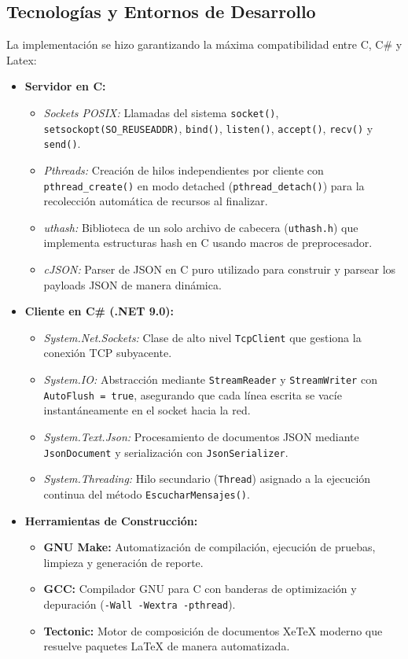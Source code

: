 \documentclass[12pt,a4paper]{article}
\begin{document}
\subsection{Tecnologías y Entornos de Desarrollo}
La implementación se hizo garantizando la máxima compatibilidad entre C, C\# y Latex:
\begin{itemize}
    \item \textbf{Servidor en C:}
    \begin{itemize}
        \item \textit{Sockets POSIX:} Llamadas del sistema \texttt{socket()}, \texttt{setsockopt(SO\_REUSEADDR)}, \texttt{bind()}, \texttt{listen()}, \texttt{accept()}, \texttt{recv()} y \texttt{send()}.
        \item \textit{Pthreads:} Creación de hilos independientes por cliente con \texttt{pthread\_create()} en modo detached (\texttt{pthread\_detach()}) para la recolección automática de recursos al finalizar.
        \item \textit{uthash:} Biblioteca de un solo archivo de cabecera (\texttt{uthash.h}) que implementa estructuras hash en C usando macros de preprocesador.
        \item \textit{cJSON:} Parser de JSON en C puro utilizado para construir y parsear los payloads JSON de manera dinámica.
    \end{itemize}
    \item \textbf{Cliente en C\# (.NET 9.0):}
    \begin{itemize}
        \item \textit{System.Net.Sockets:} Clase de alto nivel \texttt{TcpClient} que gestiona la conexión TCP subyacente.
        \item \textit{System.IO:} Abstracción mediante \texttt{StreamReader} y \texttt{StreamWriter} con \texttt{AutoFlush = true}, asegurando que cada línea escrita se vacíe instantáneamente en el socket hacia la red.
        \item \textit{System.Text.Json:} Procesamiento de documentos JSON mediante \texttt{JsonDocument} y serialización con \texttt{JsonSerializer}.
        \item \textit{System.Threading:} Hilo secundario (\texttt{Thread}) asignado a la ejecución continua del método \texttt{EscucharMensajes()}.
    \end{itemize}
    \item \textbf{Herramientas de Construcción:}
    \begin{itemize}
        \item \textbf{GNU Make:} Automatización de compilación, ejecución de pruebas, limpieza y generación de reporte.
        \item \textbf{GCC:} Compilador GNU para C con banderas de optimización y depuración (\texttt{-Wall -Wextra -pthread}).
        \item \textbf{Tectonic:} Motor de composición de documentos XeTeX moderno que resuelve paquetes LaTeX de manera automatizada.
    \end{itemize}
\end{itemize}
\end{document}
